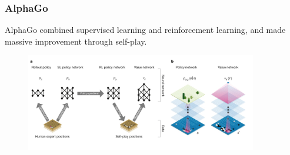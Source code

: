 \documentclass{beamer}
\begin{document}


\begin{frame}
\frametitle{AlphaGo}

AlphaGo combined supervised learning and reinforcement learning, and made massive improvement through self-play.

\begin{figure}[!h]
\begin{center}
\includegraphics[width=0.9\textwidth]{figures/alphago_network.png}
\end{center}
\end{figure}


\end{frame}


\end{document}
